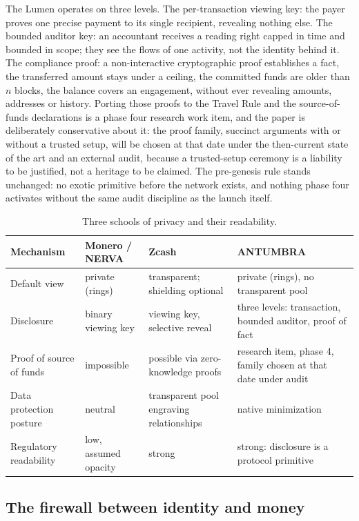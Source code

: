 The Lumen operates on three levels. The per-transaction viewing key: the
payer proves one precise payment to its single recipient, revealing
nothing else. The bounded auditor key: an accountant receives a reading
right capped in time and bounded in scope; they see the flows of one
activity, not the identity behind it. The compliance proof: a
non-interactive cryptographic proof establishes a fact, the transferred
amount stays under a ceiling, the committed funds are older than $n$
blocks, the balance covers an engagement, without ever revealing amounts,
addresses or history. Porting those proofs to the Travel Rule and the
source-of-funds declarations is a phase four research work item, and the
paper is deliberately conservative about it: the proof family, succinct
arguments with or without a trusted setup, will be chosen at that date
under the then-current state of the art and an external audit, because a
trusted-setup ceremony is a liability to be justified, not a heritage to
be claimed. The pre-genesis rule stands unchanged: no exotic primitive
before the network exists, and nothing phase four activates without the
same audit discipline as the launch itself.

\begin{table}[htbp]
\centering
\small
\caption{Three schools of privacy and their readability.}
\label{tab:privacy}
\begin{tabularx}{\textwidth}{@{}L{3.1cm}YYY@{}}
\toprule
Mechanism & Monero / NERVA & Zcash & ANTUMBRA \\
\midrule
Default view & private (rings) & transparent; shielding optional & private (rings), no transparent pool \\
Disclosure & binary viewing key & viewing key, selective reveal & three levels: transaction, bounded auditor, proof of fact \\
Proof of source of funds & impossible & possible via zero-knowledge proofs & research item, phase 4, family chosen at that date under audit \\
Data protection posture & neutral & transparent pool engraving relationships & native minimization \\
Regulatory readability & low, assumed opacity & strong & strong: disclosure is a protocol primitive \\
\bottomrule
\end{tabularx}
\end{table}

\subsection{The firewall between identity and money}


